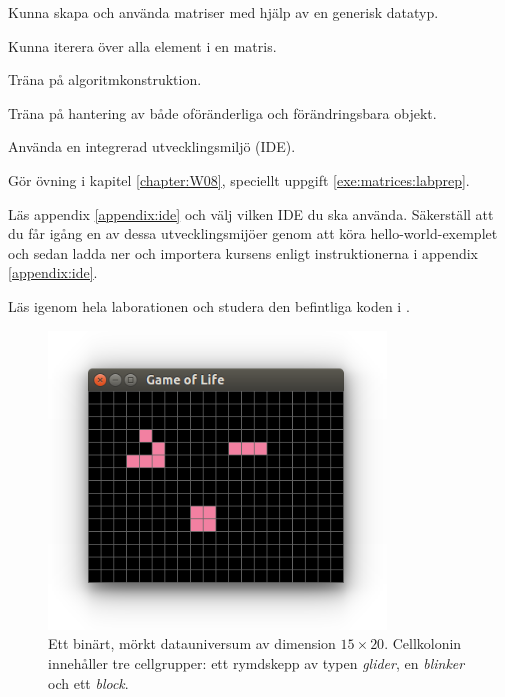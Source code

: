 
\Lab{\LabWeekEIGHT}

\begin{Goals}
\item Kunna skapa och använda matriser med hjälp av en generisk datatyp.
\item Kunna iterera över alla element i en matris.
\item Träna på algoritmkonstruktion.
\item Träna på hantering av både oföränderliga och förändringsbara objekt.
\item Använda en integrerad utvecklingsmiljö (IDE).
\end{Goals}

\begin{Preparations}
\item Gör övning {\tt \ExeWeekEIGHT} i kapitel \ref{chapter:W08}, speciellt uppgift \ref{exe:matrices:labprep}.

\item Läs appendix \ref{appendix:ide} och välj vilken IDE du ska använda. Säkerställ att du får igång en av dessa utvecklingsmijöer genom att köra hello-world-exemplet och sedan ladda ner och importera kursens  enligt instruktionerna i appendix \ref{appendix:ide}.

\item Läs igenom hela laborationen och studera den befintliga koden i  .

\end{Preparations}


\begin{figure}[H]
  \includegraphics[width=0.8\textwidth]{../img/glider-blinker-block}

  \vspace{-2em}\caption{\label{lab:life:glider-blinker-block}Ett binärt, mörkt datauniversum av dimension $15  \times 20$. Cellkolonin innehåller tre cellgrupper: ett rymdskepp av typen \emph{glider}, en \emph{blinker} och ett \emph{block}.}
\end{figure}


